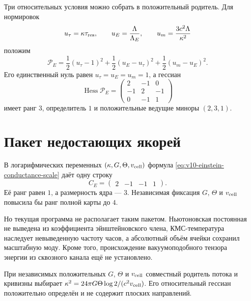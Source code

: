 Три относительных условия можно собрать в положительный родитель. Для
нормировок
\begin{equation}
 u_\tau=\kappa\tau_{\rm res},
 \qquad u_E=\frac{\Lambda}{\Lambda_E},
 \qquad u_m=\frac{3c^2\Lambda}{\kappa^2}
\end{equation}
положим
\begin{equation}
 \mathcal P_E
 =\frac12(u_\tau-1)^2
 +\frac12(u_E-u_\tau)^2
 +\frac12(u_m-u_E)^2.
 \label{eq:v10-einstein-response-parent}
\end{equation}
Его единственный нуль равен $u_\tau=u_E=u_m=1$, а гессиан
\begin{equation}
 \operatorname{Hess}\mathcal P_E=
 \begin{pmatrix}
 2&-1&0\\
 -1&2&-1\\
 0&-1&1
 \end{pmatrix}
 \label{eq:v10-einstein-response-hessian}
\end{equation}
имеет ранг $3$, определитель $1$ и положительные ведущие миноры
$(2,3,1)$.

\section{Пакет недостающих якорей}

В логарифмических переменных $(\kappa,G,\Theta,v_{\rm cell})$ формула
\eqref{eq:v10-einstein-conductance-scale} даёт одну строку
\begin{equation}
 C_E=\begin{pmatrix}2&-1&-1&1\end{pmatrix}.
 \label{eq:v10-einstein-anchor-map}
\end{equation}
Её ранг равен $1$, а размерность ядра --- $3$. Независимая фиксация
$G$, $\Theta$ и $v_{\rm cell}$ повысила бы ранг полной карты до $4$.

Но текущая программа не располагает таким пакетом. Ньютоновская постоянная
не выведена из коэффициента эйнштейновского члена, КМС-температура наследует
невыведенную частоту часов, а абсолютный объём ячейки сохранил масштабную
моду. Кроме того, происхождение вакуумоподобного тензора энергии из
сквозного канала ещё не установлено.

\begin{theorem}
При независимых положительных $G$, $\Theta$ и $v_{\rm cell}$ совместный
родитель потока и кривизны выбирает
$\kappa^2=24\pi G\Theta\log2/(c^2v_{\rm cell})$. Его относительный гессиан
положительно определён и не содержит плоских направлений.
\end{theorem}

